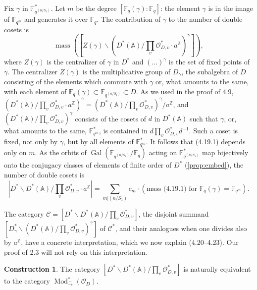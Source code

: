 \documentclass[11pt,a4paper]{article}
\theoremstyle{plain}
\theoremstyle{definition}
\newtheorem{construction}[theorem]{Construction}
\DeclareMathOperator{\Gal}{Gal}
\DeclareMathOperator{\mass}{mass}
\DeclareMathOperator{\Mod}{Mod}
\newcommand{\Fq}{\mathbb{F}_q}
\newcommand{\F}{\mathbb{F}}
\newcommand{\Z}{\mathbb{Z}}
\newcommand{\isom}{\xrightarrow{\sim}}
\begin{document}
Fix $\gamma$ in $\F_{q^{(n/S_1)}}^*$. Let $m$ be the degree $[\F_q(\gamma) : \Fq]$: the element $\gamma$ is in the image of $\F_{q^m}$ and generates it over $\Fq$. The contribution of $\gamma$ to the number of double cosets is
\begin{equation}
\mass([Z(\gamma) \backslash (D^*(\mathbb{A}) / \prod_v \mathcal{O}_{D,v}^* \cdot a^{\Z})^\gamma]), \tag{4.19.1}
\end{equation}
where $Z(\gamma)$ is the centralizer of $\gamma$ in $D^*$ and $(\ldots)^\gamma$ is the set of fixed points of $\gamma$. The centralizer $Z(\gamma)$ is the multiplicative group of $D_\gamma$, the subalgebra of $D$ consisting of the elements which commute with $\gamma$ or, what amounts to the same, with each element of $\F_q(\gamma) \subset \F_{q^{(n/S_1)}} \subset D$. As we used in the proof of 4.9, $(D^*(\mathbb{A}) / \prod_v \mathcal{O}_{D,v}^* \cdot a^{\Z})^\gamma = (D^*(\mathbb{A}) / \prod_v \mathcal{O}_{D,v}^*)^\gamma / a^{\Z}$, and $(D^*(\mathbb{A}) / \prod_v \mathcal{O}_{D,v}^*)^\gamma$ consists of the cosets of $d$ in $D^*(\mathbb{A})$ such that $\gamma$, or, what amounts to the same, $\F_{q^m}^*$, is contained in $d \prod_v \mathcal{O}_{D,v}^* d^{-1}$. Such a coset is fixed, not only by $\gamma$, but by all elements of $\F_{q^m}^*$. It follows that (4.19.1) depends only on $m$. As the orbits of $\Gal(\F_{q^{(n/S_1)}}/\Fq)$ acting on $\F_{q^{(n/S_1)}}^*$ map bijectively onto the conjugacy classes of elements of finite order of $D^*$ (\ref{prop:embed}), the number of double cosets is
\begin{equation}
|D^* \backslash D^*(\mathbb{A}) / \prod_v \mathcal{O}_{D,v}^* \cdot a^{\Z}| = \sum_{m | (n/S_1)} c_m \cdot (\text{mass (4.19.1) for } \F_q(\gamma) = \F_{q^m}). \tag{4.19.2}
\end{equation}

The category $\mathcal{C} = [D^* \backslash D^*(\mathbb{A}) / \prod_v \mathcal{O}_{D,v}^*]$, the disjoint summand $[D_\gamma^* \backslash (D^*(\mathbb{A}) / \prod_v \mathcal{O}_{D,v}^*)^\gamma]$ of $\mathcal{C}^*$, and their analogues when one divides also by $a^{\Z}$, have a concrete interpretation, which we now explain (4.20--4.23). Our proof of 2.3 will not rely on this interpretation.

\begin{construction}
The category $[D^* \backslash D^*(\mathbb{A}) / \prod_v \mathcal{O}_{D,v}^*]$ is naturally equivalent to the category $\Mod^*_{\isom}(\mathcal{O}_D)$.
\end{construction}
\end{document}
